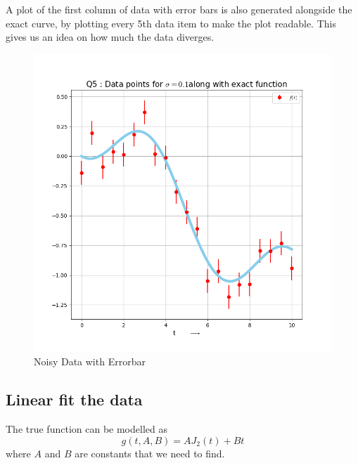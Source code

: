 \documentclass[11pt, a4paper]{article}
\begin{document}
            A plot of the first column of data with error bars is also generated alongside the exact curve, by plotting every 5th data item to make the plot readable. This gives us an idea on how much the data diverges.
            \begin{figure}[H]
                \centering
                \includegraphics[scale=0.75]{error_bar.png}
                \caption{Noisy Data with Errorbar}
                \label{fig:noiseError}
            \end{figure}


        \subsection{Linear fit the data}
            The true function can be modelled as
            \begin{equation}
                g(t, A, B) = AJ_2(t)+Bt
            \end{equation}
            where $A$ and $B$ are constants that we need to find.\\
\end{document}
